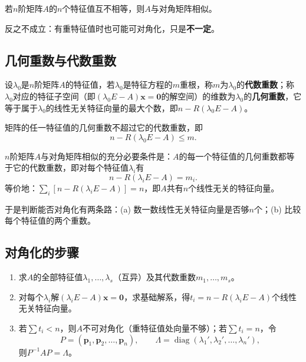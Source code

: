 \begin{corollary}
若$n$阶矩阵$A$的$n$个特征值互不相等，则$A$与对角矩阵相似。
\end{corollary}

反之不成立：有重特征值时也可能可对角化，只是\textbf{不一定}。

\subsection{几何重数与代数重数}
\begin{definition}
设$\lambda_0$是$n$阶矩阵$A$的特征值，若$\lambda_0$是特征方程的$m$重根，称$m$为$\lambda_0$的\textbf{代数重数}；称$\lambda_0$对应的特征子空间（即$(\lambda_0E-A)\boldsymbol{x}=\boldsymbol{0}$的解空间）的维数为$\lambda_0$的\textbf{几何重数}，它等于属于$\lambda_0$的线性无关特征向量的最大个数，即$n-R(\lambda_0E-A)$。
\end{definition}

\begin{theorem}
矩阵的任一特征值的几何重数不超过它的代数重数，即
\[
n-R(\lambda_0E-A)\le m .
\]
\end{theorem}

\begin{theorem}[可对角化的重数判据]
$n$阶矩阵$A$与对角矩阵相似的充分必要条件是：$A$的每一个特征值的几何重数都等于它的代数重数，即对每个特征值$\lambda_i$有
\[
n-R(\lambda_iE-A)=m_i .
\]
等价地：$\sum_i\left[n-R(\lambda_iE-A)\right]=n$，即$A$共有$n$个线性无关的特征向量。
\end{theorem}

于是判断能否对角化有两条路：(a) 数一数线性无关特征向量是否够$n$个；(b) 比较每个特征值的两个重数。

\subsection{对角化的步骤}
\begin{enumerate}
    \item 求$A$的全部特征值$\lambda_1,\dots,\lambda_s$（互异）及其代数重数$m_1,\dots,m_s$。
    \item 对每个$\lambda_i$解$(\lambda_iE-A)\boldsymbol{x}=\boldsymbol{0}$，求基础解系，得$t_i=n-R(\lambda_iE-A)$个线性无关特征向量。
    \item 若$\sum t_i<n$，则$A$不可对角化（重特征值处向量不够）；若$\sum t_i=n$，令
    \[
    P=(\boldsymbol{p}_1,\boldsymbol{p}_2,\dots,\boldsymbol{p}_n),\qquad
    \Lambda=\operatorname{diag}(\lambda_1',\lambda_2',\dots,\lambda_n'),
    \]
    则$P^{-1}AP=\Lambda$。
\end{enumerate}

